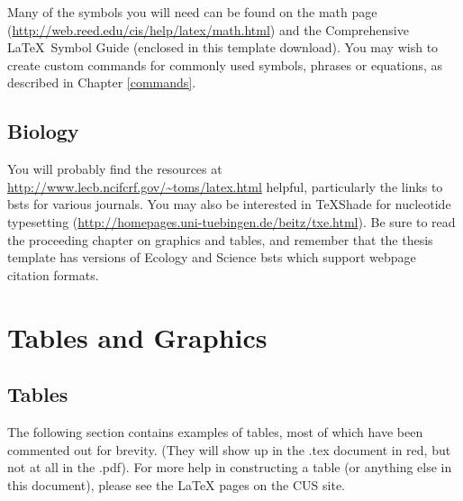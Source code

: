 \documentclass[12pt,twoside]{reedthesis}
\begin{document}
Many of the symbols you will need can be found on the math page (\url{http://web.reed.edu/cis/help/latex/math.html}) and the Comprehensive \LaTeX\ Symbol Guide (enclosed in this template download).  You may wish to create custom commands for commonly used symbols, phrases or equations, as described in Chapter \ref{commands}.

\section{Biology}
You will probably find the resources at \url{http://www.lecb.ncifcrf.gov/~toms/latex.html} helpful, particularly the links to bsts for various journals. You may also be interested in TeXShade for nucleotide typesetting (\url{http://homepages.uni-tuebingen.de/beitz/txe.html}).  Be sure to read the proceeding chapter on graphics and tables, and remember that the thesis template has versions of Ecology and Science bsts which support webpage citation formats.

\chapter{Tables and Graphics}

\section{Tables}
        The following section contains examples of tables, most of which have been commented out for brevity. (They will show up in the .tex document in red, but not at all in the .pdf). For more help in constructing a table (or anything else in this document), please see the LaTeX pages on the CUS site.
\end{document}
